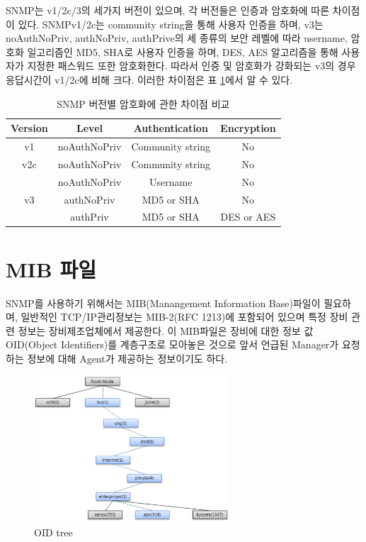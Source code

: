 \documentclass[11pt
  , a4paper
  , article
  , oneside
]{memoir}
\begin{document}
\hfil\break
\hfil\break
\hfil\break
\hfil\break

SNMP는 v1/2c/3의 세가지 버전이 있으며, 각 버전들은 인증과 암호화에 따른 차이점이 있다. SNMPv1/2c는 community string을 통해 사용자 인증을 하며, v3는 noAuthNoPriv, authNoPriv, authPrive의 세 종류의 보안 레벨에 따라 username, 암호화 일고리즘인 MD5, SHA로 사용자 인증을 하며, DES, AES 알고리즘을 통해 사용자가 지정한 패스워드 또한 암호화한다. 따라서 인증 및 암호화가 강화되는 v3의 경우 응답시간이 v1/2c에 비해 크다. 이러한 차이점은 표 \ref{table:conparision}\citep{comparison}에서 알 수 있다.

\begin{table}[h!]
\begin{center}
\begin{tabular}{c|c|c|c}\hline
Version & Level & Authentication & Encryption \\ \hline
v1 & noAuthNoPriv & Community string & No \\ \hline
v2c & noAuthNoPriv & Community string & No \\ \hline
 & noAuthNoPriv & Username & No \\ \cline{2-4}
v3 & authNoPriv & MD5 or SHA & No \\ \cline{2-4}
 & authPriv & MD5 or SHA & DES or AES \\ \hline
\end{tabular}
\caption{SNMP 버전별 암호화에 관한 차이점 비교}
  \label{table:conparision}  
\end{center}
\end{table} 

\section{MIB 파일}
SNMP를 사용하기 위해서는 MIB(Manangement Information Base)파일이 필요하며, 일반적인 TCP/IP관리정보는 MIB-2(RFC 1213)에 포함되어 있으며 특정 장비 관련 정보는 장비제조업체에서 제공한다. 이 MIB파일은 장비에 대한 정보 값 OID(Object Identifiers)를 계층구조로 모아놓은 것으로 앞서 언급된 Manager가 요청하는 정보에 대해 Agent가 제공하는 정보이기도 하다. 

\begin{figure}[h!]
  \centering
  \includegraphics[width=0.65\textwidth]{./images/oid_tree.eps}
  \caption{OID tree}
  \label{fig:oid_tree} 
\end{figure}
\end{document}
